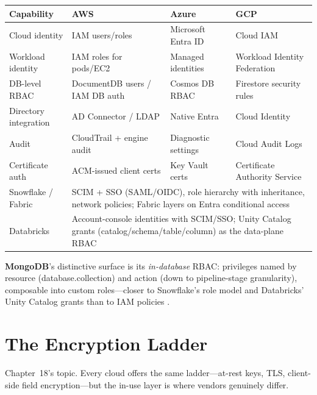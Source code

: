 \begin{center}
\footnotesize
\begin{tabular}{@{}p{2.9cm}p{3.0cm}p{3.0cm}p{3.0cm}@{}}
\toprule
\textbf{Capability} & \textbf{AWS} & \textbf{Azure} & \textbf{GCP} \\
\midrule
Cloud identity & IAM users/roles & Microsoft Entra ID & Cloud IAM \\
Workload identity & IAM roles for pods/EC2 & Managed identities & Workload Identity Federation \\
DB-level RBAC & DocumentDB users / IAM DB auth & Cosmos DB RBAC & Firestore security rules \\
Directory integration & AD Connector / LDAP & Native Entra & Cloud Identity \\
Audit & CloudTrail + engine audit & Diagnostic settings & Cloud Audit Logs \\
Certificate auth & ACM-issued client certs & Key Vault certs & Certificate Authority Service \\
\addlinespace
Snowflake / Fabric & \multicolumn{3}{l}{SCIM + SSO (SAML/OIDC), role hierarchy with inheritance, network policies; Fabric layers on Entra conditional access} \\
Databricks & \multicolumn{3}{l}{Account-console identities with SCIM/SSO; Unity Catalog grants (catalog/schema/table/column) as the data-plane RBAC} \\
\bottomrule
\end{tabular}
\end{center}

\noindent \textbf{MongoDB}'s distinctive surface is its \emph{in-database} RBAC: privileges named
by resource (database.collection) and action (down to pipeline-stage granularity), composable into
custom roles---closer to Snowflake's role model and Databricks' Unity Catalog grants than to IAM
policies \cite{mongodbSecurityChecklistDocs,mongodbRBACDocs}.

\section{The Encryption Ladder}
%
Chapter~18's topic. Every cloud offers the same ladder---at-rest keys, TLS, client-side field
encryption---but the in-use layer is where vendors genuinely differ.

